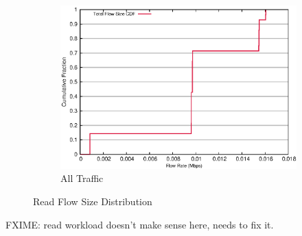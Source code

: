\begin{figure}[!htpb]
\begin{subfigure}[b]{.55\linewidth}
	\includegraphics[width=.99\textwidth]{figures/4read/flow_size.eps}
	\caption{All Traffic}\label{fig:read_size:all}
   \end{subfigure}%
\caption{Read Flow Size Distribution}
\label{fig:read_size}
\end{figure}

FXIME: read workload doesn't make sense here, needs to fix it.


